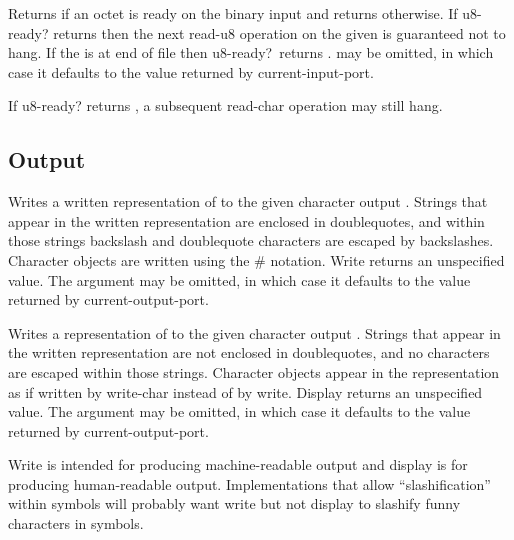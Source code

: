 \begin{entry}{%
}

Returns \schtrue{} if an octet is ready on the binary input 
and returns \schfalse{} otherwise.  If {\cf u8-ready?} returns
\schtrue{} then the next {\cf read-u8} operation on the given
 is guaranteed not to hang.  If the  is at end of
file then {\cf u8-ready?}\ returns \schtrue.   may be
omitted, in which case it defaults to the value returned by {\cf
  current-input-port}.

\begin{note}
If {\cf u8-ready?} returns \schtrue{}, a subsequent {\cf read-char}
operation may still hang.
\end{note}
\end{entry}

\subsection{Output}
\label{outputsection}

\noindent \hbox{}
\vspace{-5ex}

\begin{entry}{%
}

Writes a written representation of  to the given character output
.  Strings
that appear in the written representation are enclosed in doublequotes, and
within those strings backslash and doublequote characters are
escaped by backslashes.
Character objects are written using the {\cf \#\backwhack} notation.
{\cf Write} returns an unspecified value.  The
 argument may be omitted, in which case it defaults to the value
returned by {\cf current-output-port}.

\end{entry}


\begin{entry}{%
}

Writes a representation of  to the given character output .
Strings that appear in the written representation are not enclosed in
doublequotes, and no characters are escaped within those strings.  Character
objects appear in the representation as if written by {\cf write-char}
instead of by {\cf write}.  {\cf Display} returns an unspecified value.
The  argument may be omitted, in which case it defaults to the
value returned by {\cf current-output-port}.

\begin{rationale}
{\cf Write} is intended
for producing mach\-ine-readable output and {\cf display} is for producing
human-readable output.  Implementations that allow ``slashification''
within symbols will probably want {\cf write} but not {\cf display} to
slashify funny characters in symbols.
\end{rationale}
\end{entry}


